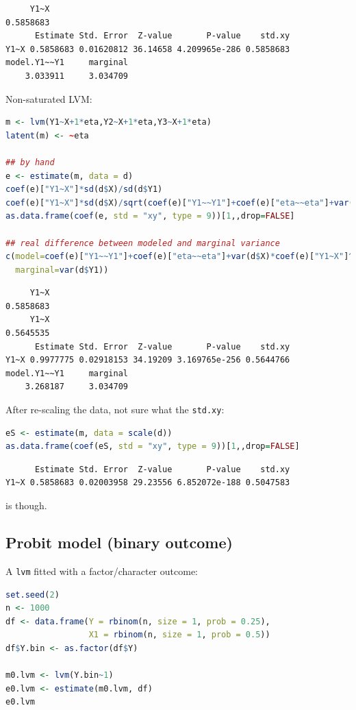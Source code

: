 \documentclass{article}
\begin{document}
\label{}
\begin{verbatim}
     Y1~X 
0.5858683
      Estimate Std. Error  Z-value       P-value    std.xy
Y1~X 0.5858683 0.01620812 36.14658 4.209965e-286 0.5858683
model.Y1~~Y1     marginal 
    3.033911     3.034709
\end{verbatim}


Non-saturated LVM:
\begin{lstlisting}[language=r,numbers=none]
m <- lvm(Y1~X+1*eta,Y2~X+1*eta,Y3~X+1*eta)
latent(m) <- ~eta

## by hand
e <- estimate(m, data = d)
coef(e)["Y1~X"]*sd(d$X)/sd(d$Y1)
coef(e)["Y1~X"]*sd(d$X)/sqrt(coef(e)["Y1~~Y1"]+coef(e)["eta~~eta"]+var(d$X)*coef(e)["Y1~X"]^2)
as.data.frame(coef(e, std = "xy", type = 9))[1,,drop=FALSE]

## real difference between modeled and marginal variance
c(model=coef(e)["Y1~~Y1"]+coef(e)["eta~~eta"]+var(d$X)*coef(e)["Y1~X"]^2,
  marginal=var(d$Y1))
\end{lstlisting}

\label{}
\begin{verbatim}
     Y1~X 
0.5858683
     Y1~X 
0.5645535
      Estimate Std. Error  Z-value       P-value    std.xy
Y1~X 0.9977775 0.02918153 34.19209 3.169765e-256 0.5644766
model.Y1~~Y1     marginal 
    3.268187     3.034709
\end{verbatim}


After re-scaling the data, not sure what the \texttt{std.xy}:
\begin{lstlisting}[language=r,numbers=none]
eS <- estimate(m, data = scale(d))
as.data.frame(coef(eS, std = "xy", type = 9))[1,,drop=FALSE]
\end{lstlisting}

\label{}
\begin{verbatim}
      Estimate Std. Error  Z-value       P-value    std.xy
Y1~X 0.5858683 0.02003958 29.23556 6.852072e-188 0.5047583
\end{verbatim}


is though.
\subsection{Probit model (binary outcome)}
\label{sec:org23d8ed4}

A \texttt{lvm} fitted with a factor/character outcome:
\begin{lstlisting}[language=r,numbers=none]
set.seed(2)
n <- 1000
df <- data.frame(Y = rbinom(n, size = 1, prob = 0.25),
                 X1 = rbinom(n, size = 1, prob = 0.5))
df$Y.bin <- as.factor(df$Y)

m0.lvm <- lvm(Y.bin~1)
e0.lvm <- estimate(m0.lvm, df)
e0.lvm
\end{lstlisting}
\end{document}
